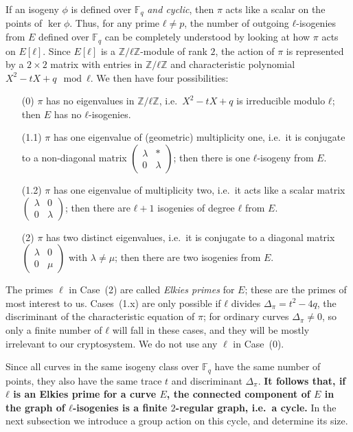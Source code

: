 \documentclass{llncs}
\newcommand{\F}{\mathbb{F}}
\begin{document}
If an isogeny $ϕ$ is defined over $\F_q$ \emph{and cyclic},
then $π$ acts like a scalar on the points of $\ker ϕ$. 
Thus, for any prime $ℓ≠p$, the number of outgoing $ℓ$-isogenies from $E$ 
defined over $\F_q$ can be
completely understood by looking at how $π$ acts on $E[ℓ]$. Since $E[ℓ]$
is a $ℤ/ℓℤ$-module of rank $2$, the action of $π$ is represented by a
$2×2$ matrix with entries in $ℤ/ℓℤ$ and characteristic polynomial
$X^2-tX+q\mod ℓ$. We then have four possibilities:
\begin{itemize}
\item[(0)] $π$ has no eigenvalues in $ℤ/ℓℤ$, i.e.\ $X^2-tX+q$ is
  irreducible modulo $ℓ$; then $E$ has no $ℓ$-isogenies.
\item[(1.1)] $π$ has one eigenvalue of (geometric) multiplicity one,
  i.e.\ it is conjugate to a non-diagonal matrix
  $\left(\begin{smallmatrix}λ&*\\0&λ\end{smallmatrix}\right)$; then
  there is one $ℓ$-isogeny from $E$.
\item[(1.2)] $π$ has one eigenvalue of multiplicity two, i.e.\ it acts
  like a scalar matrix
  $\left(\begin{smallmatrix}λ&0\\0&λ\end{smallmatrix}\right)$; then
  there are $ℓ+1$ isogenies of degree $ℓ$ from $E$.
\item[(2)] $π$ has two distinct eigenvalues, i.e.\ it is conjugate to a
  diagonal matrix
  $\left(\begin{smallmatrix}λ&0\\0&μ\end{smallmatrix}\right)$
	with $\lambda\neq\mu$; then
  there are two isogenies from $E$.
\end{itemize}

The primes $\ell$ in Case~(2)
are called \emph{Elkies primes} for $E$;
these are the primes of most interest to us.
Cases~(1.x) are only possible if $ℓ$ divides $Δ_π = t^2-4q$,
the discriminant of the characteristic equation of $π$;
for ordinary curves $Δ_π≠0$, so only a finite number
of $ℓ$ will fall in these cases, and they will be mostly
irrelevant to our cryptosystem.
We do not use any $\ell$ in Case~(0).

Since all curves in
the same isogeny class over $\F_q$ have the same number of points,
they also have the same trace $t$ and discriminant $Δ_π$.
\textbf{It follows that, if $ℓ$ is an Elkies prime for a curve $E$,
  the connected component of $E$ in the graph of $ℓ$-isogenies is a
  finite $2$-regular graph, i.e.\ a cycle.} In the next subsection we
introduce a group action on this cycle, and determine its size.
\end{document}
